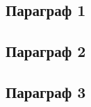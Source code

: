 \documentclass[../main.tex]{subfiles}
\begin{document}
\subsection{Параграф 1}

\subsection{Параграф 2}

\subsection{Параграф 3}
	
\end{document}

